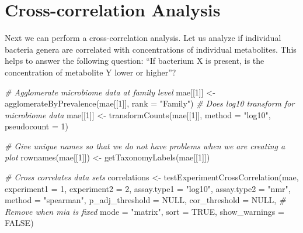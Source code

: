 \documentclass[
]{book}
\newenvironment{Shaded}{\begin{snugshade}}{\end{snugshade}}
\newcommand{\AttributeTok}[1]{\textcolor[rgb]{0.77,0.63,0.00}{#1}}
\newcommand{\CommentTok}[1]{\textcolor[rgb]{0.56,0.35,0.01}{\textit{#1}}}
\newcommand{\ConstantTok}[1]{\textcolor[rgb]{0.00,0.00,0.00}{#1}}
\newcommand{\DecValTok}[1]{\textcolor[rgb]{0.00,0.00,0.81}{#1}}
\newcommand{\FunctionTok}[1]{\textcolor[rgb]{0.00,0.00,0.00}{#1}}
\newcommand{\NormalTok}[1]{#1}
\newcommand{\OtherTok}[1]{\textcolor[rgb]{0.56,0.35,0.01}{#1}}
\newcommand{\StringTok}[1]{\textcolor[rgb]{0.31,0.60,0.02}{#1}}
\begin{document}
\hypertarget{cross-correlation}{%
\section{Cross-correlation Analysis}\label{cross-correlation}}

Next we can perform a cross-correlation analysis. Let us analyze if
individual bacteria genera are correlated with concentrations of
individual metabolites. This helps to answer the following question: ``If
bacterium X is present, is the concentration of metabolite Y lower or higher''?

\begin{Shaded}
\begin{Highlighting}[]
\CommentTok{\# Agglomerate microbiome data at family level}
\NormalTok{mae[[}\DecValTok{1}\NormalTok{]] }\OtherTok{\textless{}{-}} \FunctionTok{agglomerateByPrevalence}\NormalTok{(mae[[}\DecValTok{1}\NormalTok{]], }\AttributeTok{rank =} \StringTok{"Family"}\NormalTok{)}
\CommentTok{\# Does log10 transform for microbiome data}
\NormalTok{mae[[}\DecValTok{1}\NormalTok{]] }\OtherTok{\textless{}{-}} \FunctionTok{transformCounts}\NormalTok{(mae[[}\DecValTok{1}\NormalTok{]], }\AttributeTok{method =} \StringTok{"log10"}\NormalTok{, }\AttributeTok{pseudocount =} \DecValTok{1}\NormalTok{)}

\CommentTok{\# Give unique names so that we do not have problems when we are creating a plot}
\FunctionTok{rownames}\NormalTok{(mae[[}\DecValTok{1}\NormalTok{]]) }\OtherTok{\textless{}{-}} \FunctionTok{getTaxonomyLabels}\NormalTok{(mae[[}\DecValTok{1}\NormalTok{]])}

\CommentTok{\# Cross correlates data sets}
\NormalTok{correlations }\OtherTok{\textless{}{-}} \FunctionTok{testExperimentCrossCorrelation}\NormalTok{(mae, }
                                               \AttributeTok{experiment1 =} \DecValTok{1}\NormalTok{,}
                                               \AttributeTok{experiment2 =} \DecValTok{2}\NormalTok{,}
                                               \AttributeTok{assay.type1 =} \StringTok{"log10"}\NormalTok{, }
                                               \AttributeTok{assay.type2 =} \StringTok{"nmr"}\NormalTok{,}
                                               \AttributeTok{method =} \StringTok{"spearman"}\NormalTok{, }
                                               \AttributeTok{p\_adj\_threshold =} \ConstantTok{NULL}\NormalTok{,}
                                               \AttributeTok{cor\_threshold =} \ConstantTok{NULL}\NormalTok{,}
                                               \CommentTok{\# Remove when mia is fixed}
                                               \AttributeTok{mode =} \StringTok{"matrix"}\NormalTok{,}
                                               \AttributeTok{sort =} \ConstantTok{TRUE}\NormalTok{,}
                                               \AttributeTok{show\_warnings =} \ConstantTok{FALSE}\NormalTok{)}
\end{Highlighting}
\end{Shaded}
\end{document}
